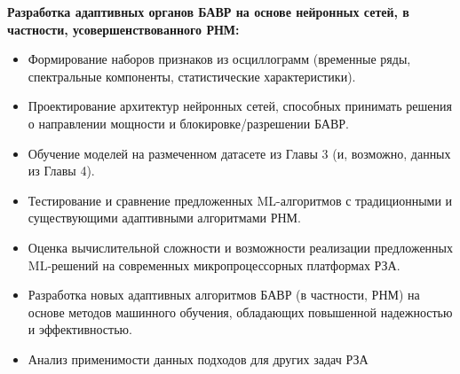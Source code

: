 \par\vspace{0.3cm}
\noindent\textbf{Разработка адаптивных органов БАВР на основе нейронных сетей, в частности, усовершенствованного РНМ:}\par\vspace{0.2cm}
\begin{itemize}
  \item Формирование наборов признаков из осциллограмм (временные ряды, спектральные компоненты, статистические характеристики).
  \item Проектирование архитектур нейронных сетей, способных принимать решения о направлении мощности и блокировке/разрешении БАВР.
  \item Обучение моделей на размеченном датасете из Главы 3 (и, возможно, данных из Главы 4).
  \item Тестирование и сравнение предложенных ML-алгоритмов с традиционными и существующими адаптивными алгоритмами РНМ.
  \item Оценка вычислительной сложности и возможности реализации предложенных ML-решений на современных микропроцессорных платформах РЗА.
  \item Разработка новых адаптивных алгоритмов БАВР (в частности, РНМ) на основе методов машинного обучения, обладающих повышенной надежностью и эффективностью.
  \item Анализ применимости данных подходов для других задач РЗА
\end{itemize}
\par\vspace{0.3cm}

\clearpage
